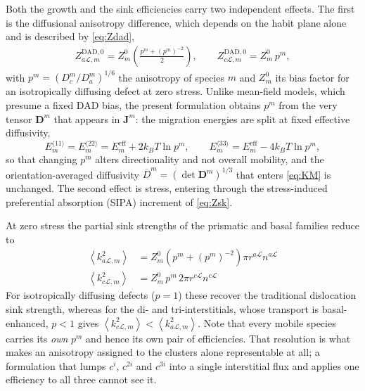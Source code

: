 \documentclass{article}
\begin{document}
Both the growth and the sink efficiencies carry two independent effects. The
first is the diffusional anisotropy difference, which depends on the habit plane
alone and is described by \cref{eq:Zdad},
\begin{align}\label{eq:DAD0}
Z^{\mathrm{DAD},0}_{a\mathcal L,m} = Z^0_m\left(\frac{p^m+(p^m)^{-2}}{2}\right),
\qquad
Z^{\mathrm{DAD},0}_{c\mathcal L,m} = Z^0_m\, p^m,
\end{align}
with $p^m=(D_c^m/D_a^m)^{1/6}$ the anisotropy of species $m$ and $Z^0_m$ its
bias factor for an isotropically diffusing defect at zero stress. Unlike
mean-field models, which presume a fixed DAD bias, the present formulation
obtains $p^m$ from the very tensor $\bm D^m$ that appears in $\bm J^m$: the
migration energies are split at fixed effective diffusivity,
\begin{equation}\label{eq:Emsplit}
E_m^{\langle11\rangle}=E_m^{\langle22\rangle}=E^{\mathrm{eff}}_m+2k_BT\ln p^m,
\qquad
E_m^{\langle33\rangle}=E^{\mathrm{eff}}_m-4k_BT\ln p^m,
\end{equation}
so that changing $p^m$ alters directionality and not overall mobility, and the
orientation-averaged diffusivity $\overline{D}^m=(\det\bm D^m)^{1/3}$ that enters
\cref{eq:KM} is unchanged. The second effect is stress, entering through the
stress-induced preferential absorption (SIPA) increment of \cref{eq:Zsk}.

At zero stress the partial sink strengths of the prismatic and basal families
reduce to
\begin{align}
\left\langle k^2_{a\mathcal{L},m }\right\rangle
  &= Z^0_{m}\left( p^m + (p^m)^{-2} \right)\pi r^{a\mathcal{L}} n^{a\mathcal{L}}
  \label{Eq:asink_strength_simple}\\
\left\langle k^2_{c\mathcal{L},m }\right\rangle
  &= Z^0_{m}\, p^m\, 2\pi r^{c\mathcal{L}} n^{c\mathcal{L}}
  \label{Eq:csink_strength_simple}
\end{align}
For isotropically diffusing defects ($p=1$) these recover the traditional
dislocation sink strength, whereas for the di- and tri-interstitials, whose
transport is basal-enhanced, $p<1$ gives $\left\langle
k^2_{c\mathcal{L},m}\right\rangle<\left\langle k^2_{a\mathcal{L},m}\right\rangle$.
Note that every mobile species carries its \emph{own} $p^m$ and hence its own
pair of efficiencies. That resolution is what makes an anisotropy assigned to
the clusters alone representable at all; a formulation that lumps $c^i$,
$c^{2i}$ and $c^{3i}$ into a single interstitial flux and applies one
efficiency to all three cannot see it.
\end{document}
